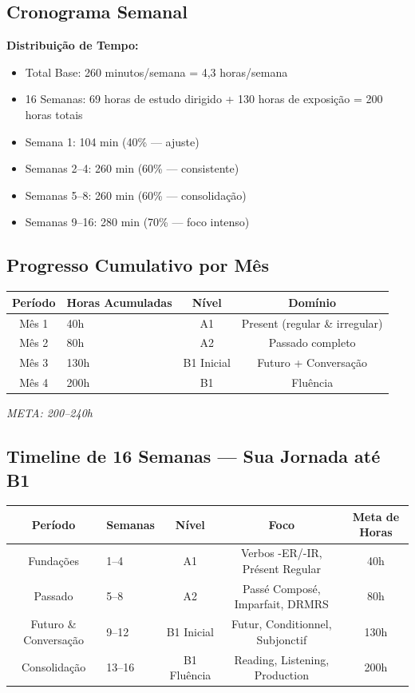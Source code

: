 \documentclass[a4paper,12pt]{article}
\begin{document}
\subsection*{Cronograma Semanal}
\textbf{Distribuição de Tempo:}
\begin{itemize}
    \item Total Base: 260 minutos/semana = 4,3 horas/semana
    \item 16 Semanas: 69 horas de estudo dirigido + 130 horas de exposição = 200 horas totais
    \item Semana 1: 104 min (40\% — ajuste)
    \item Semanas 2--4: 260 min (60\% — consistente)
    \item Semanas 5--8: 260 min (60\% — consolidação)
    \item Semanas 9--16: 280 min (70\% — foco intenso)
\end{itemize}

\subsection*{Progresso Cumulativo por Mês}
\begin{tabular}{clcc}
    \toprule
    Período & Horas Acumuladas & Nível & Domínio \\
    \midrule
    Mês 1 & 40h & A1 & Present (regular \& irregular) \\
    Mês 2 & 80h & A2 & Passado completo \\
    Mês 3 & 130h & B1 Inicial & Futuro + Conversação \\
    Mês 4 & 200h & B1 & Fluência \\
    \bottomrule
\end{tabular}
\emph{META: 200--240h}

\subsection*{Timeline de 16 Semanas — Sua Jornada até B1}
\begin{tabular}{clccc}
    \toprule
    Período & Semanas & Nível & Foco & Meta de Horas \\
    \midrule
    Fundações & 1--4 & A1 & Verbos -ER/-IR, Présent Regular & 40h \\
    Passado & 5--8 & A2 & Passé Composé, Imparfait, DRMRS & 80h \\
    Futuro \& Conversação & 9--12 & B1 Inicial & Futur, Conditionnel, Subjonctif & 130h \\
    Consolidação & 13--16 & B1 Fluência & Reading, Listening, Production & 200h \\
    \bottomrule
\end{tabular}
\end{document}
